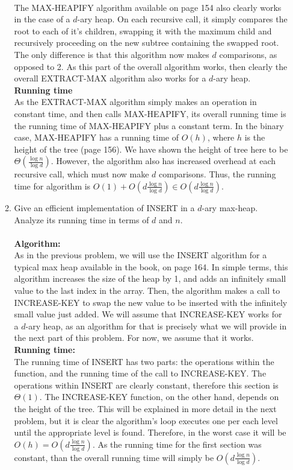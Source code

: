 \documentclass{article}
\begin{document}
\begin{enumerate}
\begin{enumerate}
\\ The MAX-HEAPIFY algorithm available on page 154 also clearly works in the case of a $d$-ary heap. On each recursive call, it simply compares the root to each of it's children, swapping it with the maximum child and recursively proceeding on the new subtree containing the swapped root. The only difference is that this algorithm now makes $d$ comparisons, as opposed to 2. As this part of the overall algorithm works, then clearly the overall EXTRACT-MAX algorithm also works for a $d$-ary heap.
\\ \textbf{Running time}
\\ As the EXTRACT-MAX algorithm simply makes an operation in constant time, and then calls MAX-HEAPIFY, its overall running time is the running time of MAX-HEAPIFY plus a constant term. In the binary case, MAX-HEAPIFY has a running time of $O(h)$, where $h$ is the height of the tree (page 156). We have shown the height of tree here to be $\Theta(\frac{\log n}{\log d})$. However, the algorithm also has increased overhead at each recursive call, which must now make $d$ comparisons. Thus, the running time for algorithm is $O(1)+O(d\frac{\log n}{\log d})\in O(d\frac{\log n}{\log d})$.
		\item Give an efficient implementation of INSERT in a $d$-ary max-heap. Analyze its running time in terms of $d$ and $n$.
\\\\ \textbf{Algorithm:}
\\ As in the previous problem, we will use the INSERT algorithm for a typical max heap available in the book, on page 164. In simple terms, this algorithm increases the size of the heap by 1, and adds an infinitely small value to the last index in the array. Then, the algorithm makes a call to INCREASE-KEY to swap the new value to be inserted with the infinitely small value just added. We will assume that INCREASE-KEY works for a $d$-ary heap, as an algorithm for that is precisely what we will provide in the next part of this problem. For now, we assume that it works.
\\ \textbf{Running time:}
\\ The running time of INSERT has two parts: the operations within the function, and the running time of the call to INCREASE-KEY. The operations within INSERT are clearly constant, therefore this section is $\Theta(1)$. The INCREASE-KEY function, on the other hand, depends on the height of the tree. This will be explained in more detail in the next problem, but it is clear the algorithm's loop executes one per each level until the appropriate level is found. Therefore, in the worst case it will be $O(h)=O(d\frac{\log n}{\log d})$. As the running time for the first section was constant, than the overall running time will simply be $O(d\frac{\log n}{\log d})$.		

\end{enumerate}
\end{enumerate}
\end{document}
